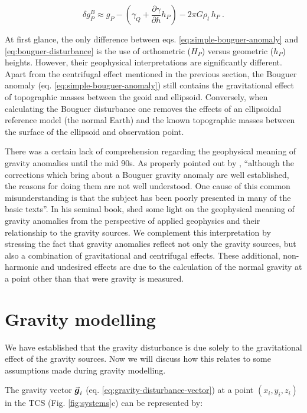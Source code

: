 \documentclass[extra]{gji}
\renewcommand{\vector}[1]{\vec{\mitbf{#1}}}
\begin{document}
\begin{equation}
\delta g_P^{B} \approx
g_{P} -
\left( \gamma_{Q} + \frac{\partial \gamma}{\partial h} h_P \right)
- 2 \pi G \rho_{t} \, h_{P} \: .
\label{eq:bouguer-disturbance}
\end{equation}

At first glance, the only difference between eqs.
\ref{eq:simple-bouguer-anomaly} and \ref{eq:bouguer-disturbance} is the use of
orthometric ($H_P$) versus geometric ($h_P$) heights.
However, their geophysical interpretations are significantly different.
Apart from the centrifugal effect mentioned in the previous section,
the Bouguer anomaly (eq. \ref{eq:simple-bouguer-anomaly}) still contains
the gravitational effect of topographic masses between the geoid and ellipsoid.
Conversely, when calculating the Bouguer disturbance one removes the effects of
an ellipsoidal reference model (the normal Earth) and the known topographic
masses between the surface of the ellipsoid and observation point.

There was a certain lack of comprehension regarding the geophysical meaning of
gravity anomalies until the mid 90s.
As properly pointed out by \citet{chapin1996},
``although the corrections which bring about a Bouguer gravity anomaly are well
established, the reasons for doing them are not well understood. One cause of
this common misunderstanding is that the subject has been poorly presented in
many of the basic texts''.
In his seminal book, \citet{blakely1996} shed some light on the geophysical
meaning of gravity anomalies from the perspective of applied geophysics and
their relationship to the gravity sources.
We complement this interpretation by stressing the fact that
gravity anomalies reflect not only the gravity sources,
but also a combination of gravitational and centrifugal effects.
These additional, non-harmonic and undesired effects are due to the calculation
of the normal gravity at a point other than that were gravity is measured.


\section{Gravity modelling}

We have established that the gravity disturbance is due solely to the
gravitational effect of the gravity sources.
Now we will discuss how this relates to some assumptions made during gravity
modelling.

The gravity vector $\vector{g}_i$ (eq. \ref{eq:gravity-disturbance-vector})
at a point $(x_i, y_i, z_i)$ in the TCS (Fig. \ref{fig:systems}c) can be
represented by:
\end{document}
